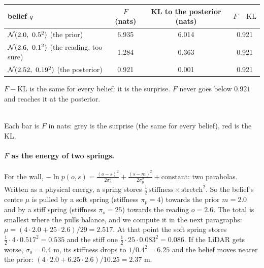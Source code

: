 \documentclass[11pt]{article}
\begin{document}
\begin{center}
\begin{tabular}{@{}lccc@{}}
\toprule
belief $q$ & $F$ (nats) & KL to the posterior (nats) & $F - \mathrm{KL}$ \\
\midrule
$\N(2.0,\ 0.5^2)$ (the prior) & 6.935 & 6.014 & 0.921 \\
$\N(2.6,\ 0.1^2)$ (the reading, too sure) & 1.284 & 0.363 & 0.921 \\
$\N(2.52,\ 0.19^2)$ (the posterior) & 0.921 & 0.001 & 0.921 \\
\bottomrule
\end{tabular}
\end{center}
$F - \mathrm{KL}$ is the same for every belief: it is the surprise. $F$ never goes below $0.921$ and reaches it at the posterior.

\begin{center}
\\[0.2em]
{\small Each bar is $F$ in nats: grey is the surprise (the same for every belief), red is the KL.}
\end{center}

\paragraph{$F$ as the energy of two springs.} For the wall, $-\ln p(o,s) = \frac{(o-s)^2}{2\sigma_o^2} + \frac{(s-m)^2}{2\sigma_p^2} + \text{constant}$: two parabolas. Written as a physical energy, a spring stores $\tfrac12\,\text{stiffness}\times\text{stretch}^2$. So the belief's centre $\mu$ is pulled by a soft spring (stiffness $\pi_p = 4$) towards the prior $m = 2.0$ and by a stiff spring (stiffness $\pi_o = 25$) towards the reading $o = 2.6$. The total is smallest where the pulls balance, and we compute it in the next paragraphs: $\mu = (4\cdot 2.0 + 25\cdot 2.6)/29 = 2.517$. At that point the soft spring stores $\tfrac12\cdot 4\cdot 0.517^2 = 0.535$ and the stiff one $\tfrac12\cdot 25\cdot 0.083^2 = 0.086$. If the LiDAR gets worse, $\sigma_o = 0.4$ m, its stiffness drops to $1/0.4^2 = 6.25$ and the belief moves nearer the prior: $(4\cdot 2.0 + 6.25\cdot 2.6)/10.25 = 2.37$ m.
\end{document}
